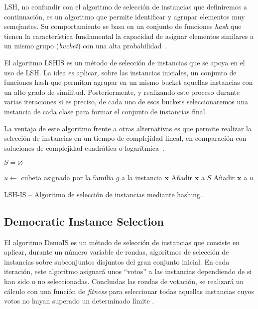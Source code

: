 LSH, no confundir con el algoritmo de selección de instancias que definiremos a continuación, es un algoritmo que permite identificar y agrupar elementos muy semejantes. Su comportamiento se basa en un conjunto de funciones \textit{hash} que tienen la característica fundamental la capacidad de asignar elementos similares a un mismo grupo (\textit{bucket}) con una alta probabilidad~\cite{LSHISPaper}.

El algoritmo LSHIS es un método de selección de instancias que se apoya en el uso de LSH. La idea es aplicar, sobre las instancias iniciales, un conjunto de funciones hash que permitan agrupar en un mismo bucket aquellas instancias con un alto grado de similitud. Posteriormente, y realizando este proceso durante varias iteraciones si es preciso, de cada uno de esos buckets seleccionaremos una instancia de cada clase para formar el conjunto de instancias final. 

La ventaja de este algoritmo frente a otras alternativas es que permite realizar la selección de instancias en un tiempo de complejidad lineal, en comparación con soluciones de complejidad cuadrática o logarítmica~\cite{LSHISPaper}.


\begin{algorithm*}
\DontPrintSemicolon
{}

$ S = \varnothing $

 {
   {
     $u\leftarrow$ cubeta asignada por la familia $g$ a la instancia $\mathbf{x}$ \;
     {
       Añadir $ \mathbf{x} $ a $ S $ \;
       Añadir $ \mathbf{x} $ a $ u $ \;
     }
  }
}

\caption{LSH-IS -- Algoritmo de selección de instancias mediante hashing. \cite{LSHISPaper}}
\label{alg:LSHIS}
\end{algorithm*}

\subsection{Democratic Instance Selection}\label{sec:defDemoIS}

El algoritmo DemoIS es un método de selección de instancias que consiste en aplicar, durante un número variable de rondas, algoritmos de selección de instancias sobre subconjuntos disjuntos del gran conjunto inicial. En cada iteración, este algoritmo asignará unos ``votos'' a las instancias dependiendo de si han sido o no seleccionadas. Concluidas las rondas de votación, se realizará un cálculo con una función de \textit{fitness} para seleccionar todas aquellas instancias cuyos votos no hayan superado un determinado límite \cite{DemoISPaper}.
 

